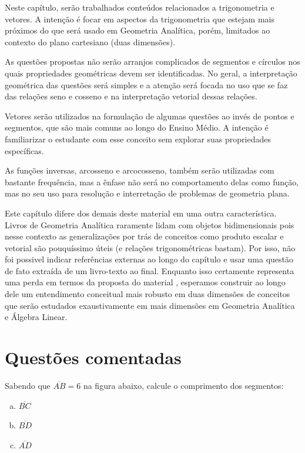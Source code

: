 \documentclass[main_estudante.tex]{subfiles}
\begin{document}
Neste capítulo, serão trabalhados conteúdos relacionados a trigonometria e vetores. A intenção é focar em aspectos da trigonometria que estejam mais próximos do que será usado em Geometria Analítica, porém, limitados ao contexto do plano cartesiano (duas dimensões).

As questões propostas não serão arranjos complicados de segmentos e círculos nos quais propriedades geométricas devem ser identificadas. No geral, a interpretação geométrica das questões será simples e a atenção será focada no uso que se faz das relações seno e cosseno e na interpretação vetorial dessas relações.

Vetores serão utilizados na formulação de algumas questões ao invés de pontos e segmentos, que são mais comuns ao longo do Ensino Médio. A intenção é familiarizar o estudante com esse conceito sem explorar suas propriedades específicas.

As funções inversas, arcosseno e arcocosseno, também serão utilizadas com bastante frequência, mas a ênfase não será no comportamento delas como função, mas no seu uso para resolução e interretação de problemas de geometria plana.

Este capítulo difere dos demais deste material em uma outra característica. Livros de Geometria Analítica raramente lidam com objetos bidimensionais pois nesse contexto as generalizações por trás de conceitos como produto escalar e vetorial são pouquíssimo úteis (e relações trigonométricas bastam). Por isso, não foi possivel indicar referências externas ao longo do capítulo e usar uma questão de fato extraída de um livro-texto ao final. Enquanto isso certamente representa uma perda em termos da proposta do material , esperamos construir ao longo dele um entendimento conceitual mais robusto em duas dimensões de conceitos que serão estudados exaustivamente em mais dimensões em Geometria Analítica e Álgebra Linear.

\section{Questões comentadas}

\begin{questao}
Sabendo que $\overline{AB}=6$ na figura abaixo, calcule o comprimento dos segmentos:
\begin{enumerate}[a)]
\item $\overline{BC}$
\item $\overline{BD}$
\item $\overline{AD}$
\end{enumerate}
\end{questao}
\end{document}

